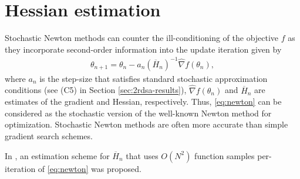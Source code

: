 \section{Hessian estimation}\label{sec:hesest}
Stochastic Newton methods can counter the ill-conditioning of the objective $f$ as they incorporate second-order information into the update iteration given by   
\begin{align}
\label{eq:newton}
\theta_{n+1} = \theta_n - a_n (\overline H_n)^{-1}\widehat\nabla f(\theta_n), 
\end{align}
where $a_n$ is the step-size that satisfies standard stochastic approximation conditions (see (C5) in Section \ref{sec:2rdsa-results}), $\widehat\nabla f(\theta_n)$ and $\overline H_n$ are estimates of the gradient and Hessian, respectively. Thus, \eqref{eq:newton} can be considered as  the stochastic version of the well-known Newton method for optimization. Stochastic Newton methods are often more accurate than simple gradient search schemes.

In \cite{fabian}, an estimation scheme for $\overline H_n$ that uses $O(N^2)$ function samples per-iteration of \eqref{eq:newton} was proposed.

